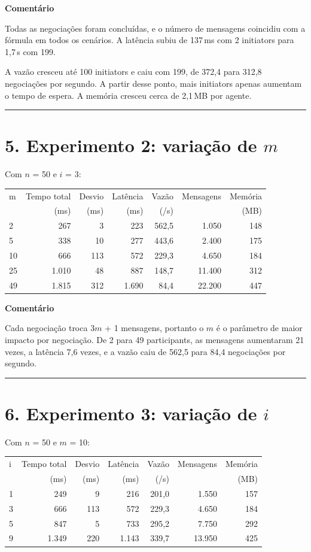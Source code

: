 \documentclass[11pt,a4paper]{article}
\newcommand{\separador}{\begin{center}\rule{0.45\linewidth}{0.4pt}\end{center}}
\begin{document}
\textbf{Comentário}

Todas as negociações foram concluídas, e o número de mensagens coincidiu com a fórmula em todos os cenários. A latência subiu de 137\,ms com 2 initiators para 1,7\,s com 199.

A vazão cresceu até 100 initiators e caiu com 199, de 372,4 para 312,8 negociações por segundo. A partir desse ponto, mais initiators apenas aumentam o tempo de espera. A memória cresceu cerca de 2,1\,MB por agente.

\separador

\section*{5. Experimento 2: variação de $m$}

Com $n$ = 50 e $i$ = 3:

\begin{center}
\small
\begin{tabular}{lrrrrrr}
\toprule
m & Tempo total & Desvio & Latência & Vazão & Mensagens & Memória \\
 & (ms) & (ms) & (ms) & (/s) &  & (MB) \\
\midrule
2 & 267 & 3 & 223 & 562,5 & 1.050 & 148 \\
5 & 338 & 10 & 277 & 443,6 & 2.400 & 175 \\
10 & 666 & 113 & 572 & 229,3 & 4.650 & 184 \\
25 & 1.010 & 48 & 887 & 148,7 & 11.400 & 312 \\
49 & 1.815 & 312 & 1.690 & 84,4 & 22.200 & 447 \\
\bottomrule
\end{tabular}
\end{center}

\textbf{Comentário}

Cada negociação troca 3$m$ + 1 mensagens, portanto o $m$ é o parâmetro de maior impacto por negociação. De 2 para 49 participants, as mensagens aumentaram 21 vezes, a latência 7,6 vezes, e a vazão caiu de 562,5 para 84,4 negociações por segundo.

\separador

\section*{6. Experimento 3: variação de $i$}

Com $n$ = 50 e $m$ = 10:

\begin{center}
\small
\begin{tabular}{lrrrrrr}
\toprule
i & Tempo total & Desvio & Latência & Vazão & Mensagens & Memória \\
 & (ms) & (ms) & (ms) & (/s) &  & (MB) \\
\midrule
1 & 249 & 9 & 216 & 201,0 & 1.550 & 157 \\
3 & 666 & 113 & 572 & 229,3 & 4.650 & 184 \\
5 & 847 & 5 & 733 & 295,2 & 7.750 & 292 \\
9 & 1.349 & 220 & 1.143 & 339,7 & 13.950 & 425 \\
\bottomrule
\end{tabular}
\end{center}
\end{document}
